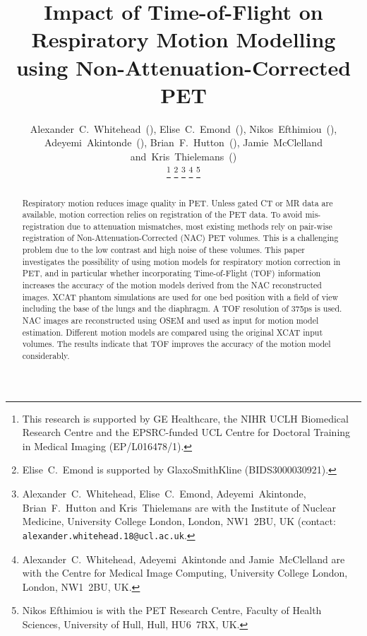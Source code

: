 \documentclass{IEEEtran}
\begin{document}
\title{Impact of Time-of-Flight on Respiratory Motion Modelling using Non-Attenuation-Corrected PET}

\author{Alexander~C.~Whitehead~(),
        Elise~C.~Emond~(),
        Nikos~Efthimiou~(),
        Adeyemi~Akintonde~(),
        Brian~F.~Hutton~(),
        Jamie~McClelland
        and~Kris~Thielemans~()%
        
    \vspace{-0.5cm}

    \thanks{This research is supported by GE Healthcare, the NIHR UCLH Biomedical Research Centre and the EPSRC-funded UCL Centre for Doctoral Training in Medical Imaging (EP/L016478/1).}%
    \thanks{Elise~C.~Emond is supported by GlaxoSmithKline (BIDS3000030921).}%
    \thanks{Alexander~C.~Whitehead, Elise~C.~Emond, Adeyemi~Akintonde, Brian~F.~Hutton and Kris~Thielemans are with the Institute of Nuclear Medicine, University College London, London, NW1~2BU, UK (contact: \texttt{alexander.whitehead.18@ucl.ac.uk}.}%
    \thanks{Alexander~C.~Whitehead, Adeyemi~Akintonde and Jamie~McClelland are with the Centre for Medical Image Computing, University College London, London, NW1~2BU, UK.}%
    \thanks{Nikos Efthimiou is with the PET Research Centre, Faculty of Health Sciences, University of Hull, Hull, HU6~7RX, UK.}%
}

\maketitle
\vspace{-1cm}

\IEEEpeerreviewmaketitle
\vspace{-1cm}

\begin{abstract}
    Respiratory motion reduces image quality in PET. Unless gated CT or MR data are available, motion correction relies on registration of the PET data. To avoid mis-registration due to attenuation mismatches, most existing methods rely on pair-wise registration of Non-Attenuation-Corrected (NAC) PET volumes. This is a challenging problem due to the low contrast and high noise of these volumes. This paper investigates the possibility of using motion models for respiratory motion correction in PET, and in particular whether incorporating Time-of-Flight (TOF) information increases the accuracy of the motion models derived from the NAC reconstructed images. XCAT phantom simulations are used for one bed position with a field of view including the base of the lungs and the diaphragm. A TOF resolution of 375ps is used. NAC images are reconstructed using OSEM and used as input for motion model estimation. Different motion models are compared using the original XCAT input volumes. The results indicate that TOF improves the accuracy of the motion model considerably.
\end{abstract}
\end{document}
